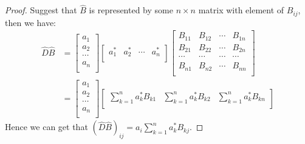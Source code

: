 \begin{proof}
Suggest that $\hat{B}$ is represented by some $n\times n$ matrix
with element of $B_{ij}$, then we have:
\begin{equation}\label{}
\begin{split}
  \hat{D}\hat{B} &=
\begin{bmatrix}
a_{1} \\
a_{2} \\
\cdots   \\
a_{n} \\
\end{bmatrix}
\begin{bmatrix}
a_{1}^{*} & a_{2}^{*} & \cdots & a_{n}^{*} \\
\end{bmatrix}
\begin{bmatrix}
     B_{11} & B_{12} & \cdots & B_{1n} \\
     B_{21} & B_{22} & \cdots & B_{2n} \\
     \cdots & \cdots & \cdots & \cdots \\
     B_{n1} & B_{n2} & \cdots & B_{nn} \\
   \end{bmatrix} \\
    &=
    \begin{bmatrix}
a_{1} \\
a_{2} \\
\cdots   \\
a_{n} \\
\end{bmatrix}
\begin{bmatrix}
\sum_{k=1}^{n}a_{k}^{*}B_{k1} & \sum_{k=1}^{n}a_{k}^{*}B_{k2}
 & \sum_{k=1}^{n}a_{k}^{*}B_{kn} \\
\end{bmatrix}
\end{split}
\end{equation}
Hence we can get that $(\hat{D}\hat{B})_{ij} =
a_{i}\sum_{k=1}^{n}a_{k}^{*}B_{kj}$.


\end{proof}
